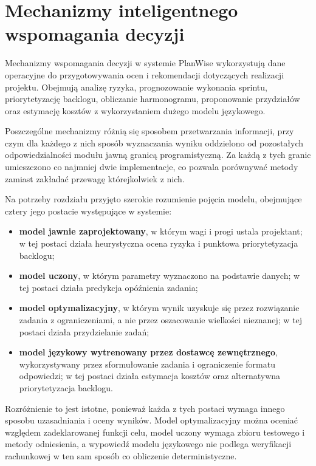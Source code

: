 \chapter{Mechanizmy inteligentnego wspomagania decyzji}
\label{chap:mechanizmy-inteligentne}

Mechanizmy wspomagania decyzji w systemie PlanWise wykorzystują dane operacyjne do przygotowywania ocen i rekomendacji dotyczących realizacji projektu. Obejmują analizę ryzyka, prognozowanie wykonania sprintu, priorytetyzację backlogu, obliczanie harmonogramu, proponowanie przydziałów oraz estymację kosztów z wykorzystaniem dużego modelu językowego.

Poszczególne mechanizmy różnią się sposobem przetwarzania informacji, przy czym dla każdego z nich sposób wyznaczania wyniku oddzielono od pozostałych odpowiedzialności modułu jawną granicą programistyczną. Za każdą z tych granic umieszczono co najmniej dwie implementacje, co pozwala porównywać metody zamiast zakładać przewagę którejkolwiek z nich.

Na potrzeby rozdziału przyjęto szerokie rozumienie pojęcia modelu, obejmujące cztery jego postacie występujące w systemie:

\begin{itemize}
    \item \textbf{model jawnie zaprojektowany}, w którym wagi i progi ustala projektant; w tej postaci działa heurystyczna ocena ryzyka i punktowa priorytetyzacja backlogu;
    \item \textbf{model uczony}, w którym parametry wyznaczono na podstawie danych; w tej postaci działa predykcja opóźnienia zadania;
    \item \textbf{model optymalizacyjny}, w którym wynik uzyskuje się przez rozwiązanie zadania z ograniczeniami, a nie przez oszacowanie wielkości nieznanej; w tej postaci działa przydzielanie zadań;
    \item \textbf{model językowy wytrenowany przez dostawcę zewnętrznego}, wykorzystywany przez sformułowanie zadania i ograniczenie formatu odpowiedzi; w tej postaci działa estymacja kosztów oraz alternatywna priorytetyzacja backlogu.
\end{itemize}

Rozróżnienie to jest istotne, ponieważ każda z tych postaci wymaga innego sposobu uzasadniania i oceny wyników. Model optymalizacyjny można oceniać względem zadeklarowanej funkcji celu, model uczony wymaga zbioru testowego i metody odniesienia, a wypowiedź modelu językowego nie podlega weryfikacji rachunkowej w ten sam sposób co obliczenie deterministyczne.

